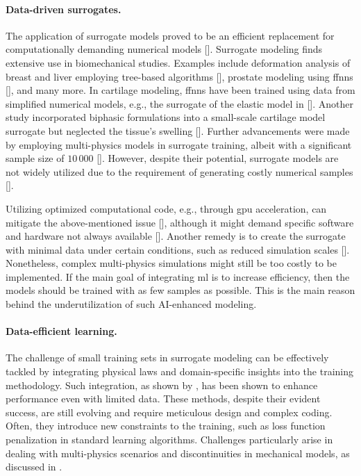 \paragraph{Data-driven surrogates.} The application of surrogate models proved to be an efficient replacement for computationally demanding numerical models [\cite{cai2021,liu2019,martinez2017}]. Surrogate modeling finds extensive use in biomechanical studies. Examples include deformation analysis of breast and liver employing tree-based algorithms [\cite{martin-guerrero2016}], prostate modeling using \acp{ffnn} [\cite{jahya2013}], and many more. In cartilage modeling, \acp{ffnn} have been trained using data from simplified numerical models, e.g., the surrogate of the elastic model in [\cite{paiva2012}]. Another study incorporated biphasic formulations into a small-scale cartilage model surrogate but neglected the tissue's swelling [\cite{arbabi2016a}]. Further advancements were made by employing multi-physics models in surrogate training, albeit with a significant sample size of $10\,000$ [\cite{arbabi2016b}]. However, despite their potential, surrogate models are not widely utilized due to the requirement of generating costly numerical samples [\cite{frank2020}].

Utilizing optimized computational code, e.g., through \ac{gpu} acceleration, can mitigate the above-mentioned issue [\cite{johnsen2015}], although it might demand specific software and hardware not always available [\cite{marinkovic2019}]. Another remedy is to create the surrogate with minimal data under certain conditions, such as reduced simulation scales [\cite{faisal2023}]. Nonetheless, complex multi-physics simulations might still be too costly to be implemented. If the main goal of integrating \ac{ml} is to increase efficiency, then the models should be trained with as few samples as possible. This is the main reason behind the underutilization of such AI-enhanced modeling.

\paragraph{Data-efficient learning.} The challenge of small training sets in surrogate modeling can be effectively tackled by integrating physical laws and domain-specific insights into the training methodology. Such integration, as shown by \cite{kashinath2021,linka2021,hoerig2020}, has been shown to enhance performance even with limited data. These methods, despite their evident success, are still evolving and require meticulous design and complex coding. Often, they introduce new constraints to the training, such as loss function penalization in standard learning algorithms. Challenges particularly arise in dealing with multi-physics scenarios and discontinuities in mechanical models, as discussed in \cite{coutinho2023,cai2021b,karniadakis2021,fuks2020}.

